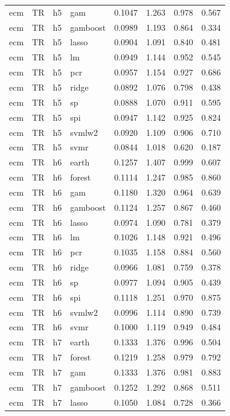 \begin{ThreePartTable}
\begin{longtable}[t]{llclcccc}
ecm & TR & h5 & gam & 0.1047 & 1.263 & 0.978 & 0.567\\
ecm & TR & h5 & gamboost & 0.0989 & 1.193 & 0.864 & 0.334\\
ecm & TR & h5 & lasso & 0.0904 & 1.091 & 0.840 & 0.481\\
ecm & TR & h5 & lm & 0.0949 & 1.144 & 0.952 & 0.545\\
ecm & TR & h5 & pcr & 0.0957 & 1.154 & 0.927 & 0.686\\
ecm & TR & h5 & ridge & 0.0892 & 1.076 & 0.798 & 0.438\\
ecm & TR & h5 & sp & 0.0888 & 1.070 & 0.911 & 0.595\\
ecm & TR & h5 & spi & 0.0947 & 1.142 & 0.925 & 0.824\\
ecm & TR & h5 & svmlw2 & 0.0920 & 1.109 & 0.906 & 0.710\\
ecm & TR & h5 & svmr & 0.0844 & 1.018 & 0.620 & 0.187\\
\addlinespace
ecm & TR & h6 & earth & 0.1257 & 1.407 & 0.999 & 0.607\\
ecm & TR & h6 & forest & 0.1114 & 1.247 & 0.985 & 0.860\\
ecm & TR & h6 & gam & 0.1180 & 1.320 & 0.964 & 0.639\\
ecm & TR & h6 & gamboost & 0.1124 & 1.257 & 0.867 & 0.460\\
ecm & TR & h6 & lasso & 0.0974 & 1.090 & 0.781 & 0.379\\
ecm & TR & h6 & lm & 0.1026 & 1.148 & 0.921 & 0.496\\
ecm & TR & h6 & pcr & 0.1035 & 1.158 & 0.884 & 0.560\\
ecm & TR & h6 & ridge & 0.0966 & 1.081 & 0.759 & 0.378\\
ecm & TR & h6 & sp & 0.0977 & 1.094 & 0.905 & 0.439\\
ecm & TR & h6 & spi & 0.1118 & 1.251 & 0.970 & 0.875\\
ecm & TR & h6 & svmlw2 & 0.0996 & 1.114 & 0.890 & 0.739\\
ecm & TR & h6 & svmr & 0.1000 & 1.119 & 0.949 & 0.484\\
\addlinespace
ecm & TR & h7 & earth & 0.1333 & 1.376 & 0.996 & 0.504\\
ecm & TR & h7 & forest & 0.1219 & 1.258 & 0.979 & 0.792\\
ecm & TR & h7 & gam & 0.1333 & 1.376 & 0.981 & 0.883\\
ecm & TR & h7 & gamboost & 0.1252 & 1.292 & 0.868 & 0.511\\
ecm & TR & h7 & lasso & 0.1050 & 1.084 & 0.728 & 0.366\\

\end{longtable}
\end{ThreePartTable}
